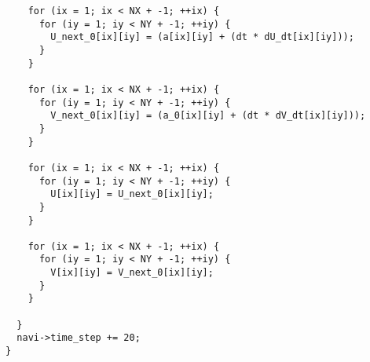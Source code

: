\begin{breakbox}
\begin{verbatim}
    for (ix = 1; ix < NX + -1; ++ix) {
      for (iy = 1; iy < NY + -1; ++iy) {
        U_next_0[ix][iy] = (a[ix][iy] + (dt * dU_dt[ix][iy]));
      }
    }

    for (ix = 1; ix < NX + -1; ++ix) {
      for (iy = 1; iy < NY + -1; ++iy) {
        V_next_0[ix][iy] = (a_0[ix][iy] + (dt * dV_dt[ix][iy]));
      }
    }

    for (ix = 1; ix < NX + -1; ++ix) {
      for (iy = 1; iy < NY + -1; ++iy) {
        U[ix][iy] = U_next_0[ix][iy];
      }
    }

    for (ix = 1; ix < NX + -1; ++ix) {
      for (iy = 1; iy < NY + -1; ++iy) {
        V[ix][iy] = V_next_0[ix][iy];
      }
    }

  }
  navi->time_step += 20;
}
\end{verbatim}
\end{breakbox}
